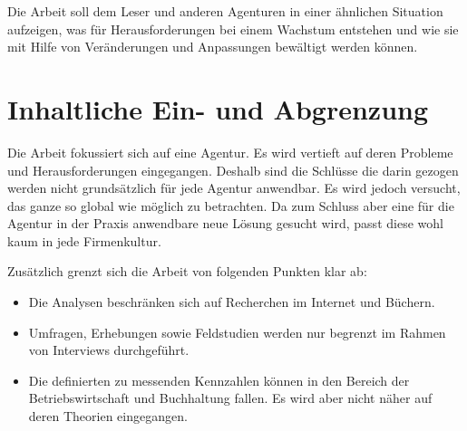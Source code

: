 Die Arbeit soll dem Leser und anderen Agenturen in einer ähnlichen Situation
aufzeigen, was für Herausforderungen bei einem Wachstum entstehen und wie
sie mit Hilfe von Veränderungen und Anpassungen bewältigt werden können.

\section{Inhaltliche Ein- und Abgrenzung}
Die Arbeit fokussiert sich auf eine Agentur. Es wird vertieft auf deren Probleme
und Herausforderungen eingegangen. Deshalb sind die Schlüsse die darin gezogen
werden nicht grundsätzlich für jede Agentur anwendbar. Es wird jedoch versucht, das
ganze so global wie möglich zu betrachten. Da zum Schluss aber eine für die
Agentur in der Praxis anwendbare neue Lösung gesucht wird, passt diese wohl
kaum in jede Firmenkultur.

Zusätzlich grenzt sich die Arbeit von folgenden Punkten klar ab:

\begin{itemize}
    \item Die Analysen beschränken sich auf Recherchen im Internet und Büchern.
    \item Umfragen, Erhebungen sowie Feldstudien werden nur begrenzt im Rahmen
        von Interviews durchgeführt.
    \item Die definierten zu messenden Kennzahlen können in den Bereich der Betriebswirtschaft
        und Buchhaltung fallen. Es wird aber nicht näher auf deren Theorien eingegangen.
\end{itemize}

